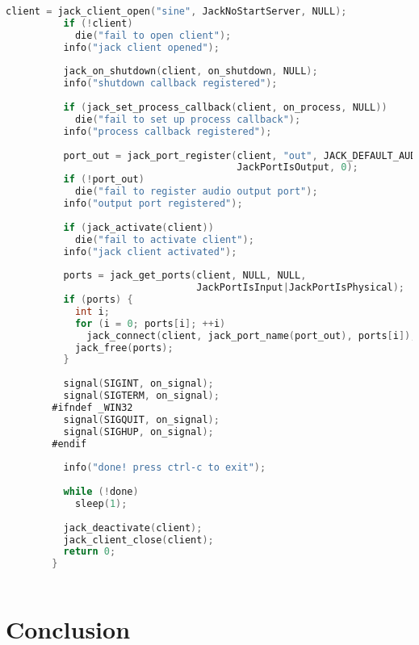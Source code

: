 \documentclass[a4paper]{article}
\begin{document}
\begin{lstlisting}[language=C,caption={Example C code},  basicstyle=\ttfamily\small, label=lst:c]
          client = jack_client_open("sine", JackNoStartServer, NULL);
          if (!client)
            die("fail to open client");
          info("jack client opened");
        
          jack_on_shutdown(client, on_shutdown, NULL);
          info("shutdown callback registered");
        
          if (jack_set_process_callback(client, on_process, NULL))
            die("fail to set up process callback");
          info("process callback registered");
        
          port_out = jack_port_register(client, "out", JACK_DEFAULT_AUDIO_TYPE,
                                        JackPortIsOutput, 0);
          if (!port_out)
            die("fail to register audio output port");
          info("output port registered");
        
          if (jack_activate(client))
            die("fail to activate client");
          info("jack client activated");
        
          ports = jack_get_ports(client, NULL, NULL,
                                 JackPortIsInput|JackPortIsPhysical);
          if (ports) {
            int i;
            for (i = 0; ports[i]; ++i)
              jack_connect(client, jack_port_name(port_out), ports[i]);
            jack_free(ports);
          }
        
          signal(SIGINT, on_signal);
          signal(SIGTERM, on_signal);
        #ifndef _WIN32
          signal(SIGQUIT, on_signal);
          signal(SIGHUP, on_signal);
        #endif
        
          info("done! press ctrl-c to exit");
        
          while (!done)
            sleep(1);
        
          jack_deactivate(client);
          jack_client_close(client);
          return 0;
        }
        
        \end{lstlisting}

\newpage
\section{Conclusion}
\lipsum[3 - 9]
\begin{center}
\end{center}
\newpage
\end{document}
